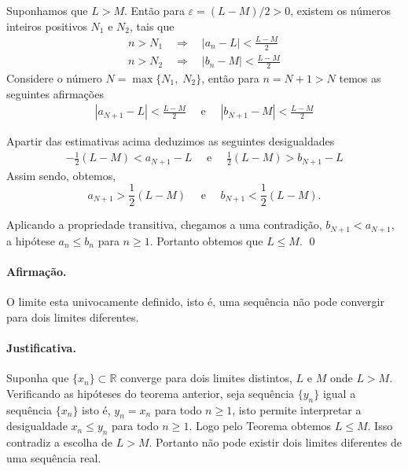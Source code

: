 \prova Suponhamos que $L>M$. Ent\~{a}o para $\varepsilon=(L-M)/2>0$, existem os n\'{u}meros inteiros positivos $N_1$ e $N_2$, tais que
\begin{align*}
    n>N_1\quad \Rightarrow \quad |a_n-L|<\frac{L-M}{2}\\[2ex]
    n>N_2\quad \Rightarrow \quad |b_n-M|<\frac{L-M}{2}
\end{align*}
Considere o n\'{u}mero $N=\max\{N_1,\;N_2\}$, ent\~{a}o para $n=N+1>N$ temos as seguintes afirma\c{c}\~{o}es
\begin{align*}
    |a_{N+1}-L|<\frac{L-M}{2}\quad \text{ e }\quad  |b_{N+1}-M|<\frac{L-M}{2}
\end{align*}

Apartir das estimativas acima deduzimos as seguintes desigualdades
\begin{align*}
    -\frac{1}{2}(L-M)<a_{N+1}-L\quad \text{ e }\quad \frac{1}{2}(L-M)>b_{N+1}-L
\end{align*}
 Assim sendo, obtemos,
 \begin{equation*}
    a_{N+1}>\frac{1}{2}(L-M)\quad \text{ e }\quad   b_{N+1}<\frac{1}{2}(L-M).
 \end{equation*}

Aplicando a propriedade transitiva, chegamos a uma contradi\c{c}\~{a}o, $b_{N+1}<a_{N+1}$, a hip\'{o}tese  $a_n\leq b_n$ para $n\geq 1$. Portanto obtemos que $L\leq M$. \qed


\paragraph{Afirma\c{c}\~{a}o.} O limite esta univocamente definido, isto \'{e}, uma sequ\^{e}ncia n\~{a}o pode convergir para dois limites diferentes.

\paragraph{Justificativa.} Suponha que $\{x_n\}\subset \mathbb{R}$ converge para dois limites distintos, $L$ e $M$ onde $L>M$. Verificando as hip\'{o}teses do teorema anterior, seja sequ\^{e}ncia $\{y_n\}$ igual a sequ\^{e}ncia $\{x_n\}$ isto \'{e}, $y_n=x_n$ para todo $n\geq 1$, isto permite interpretar a desigualdade $x_n\leq y_n$ para todo $n\geq 1$. Logo pelo Teorema obtemos $L\leq M$. Isso contradiz a escolha de $L>M$. Portanto n\~{a}o pode existir dois limites diferentes de uma sequ\^{e}ncia real.

